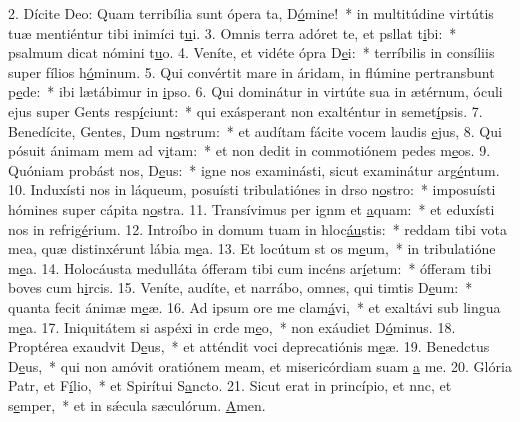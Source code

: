 2. Dícite Deo: Quam terribília sunt ópera ta, D\uline{ó}mine!~* in multitúdine virtútis tuæ mentiéntur tibi inimíci t\uline{u}i.
3. Omnis terra adóret te, et psllat t\uline{i}bi:~* psalmum dicat nómini t\uline{u}o.
4. Veníte, et vidéte ópra D\uline{e}i:~* terríbilis in consíliis super fílios h\uline{ó}minum.
5. Qui convértit mare in áridam, in flúmine pertransbunt p\uline{e}de:~* ibi lætábimur in \uline{i}pso.
6. Qui dominátur in virtúte sua in ætérnum, óculi ejus super Gents resp\uline{í}ciunt:~* qui exásperant non exalténtur in semet\uline{í}psis.
7. Benedícite, Gentes, Dum n\uline{o}strum:~* et audítam fácite vocem laudis \uline{e}jus,
8. Qui pósuit ánimam mem ad v\uline{i}tam:~* et non dedit in commotiónem pedes m\uline{e}os.
9. Quóniam probást nos, D\uline{e}us:~* igne nos examinásti, sicut examinátur arg\uline{é}ntum.
10. Induxísti nos in láqueum, posuísti tribulatiónes in drso n\uline{o}stro:~* imposuísti hómines super cápita n\uline{o}stra.
11. Transívimus per ignm et \uline{a}quam:~* et eduxísti nos in refrig\uline{é}rium.
12. Introíbo in domum tuam in hloc\uline{áu}stis:~* reddam tibi vota mea, quæ distinxérunt lábia m\uline{e}a.
13. Et locútum st os m\uline{e}um,~* in tribulatióne m\uline{e}a.
14. Holocáusta medulláta ófferam tibi cum incéns ar\uline{í}etum:~* ófferam tibi boves cum h\uline{i}rcis.
15. Veníte, audíte, et narrábo, omnes, qui timtis D\uline{e}um:~* quanta fecit ánimæ m\uline{e}æ.
16. Ad ipsum ore me clam\uline{á}vi,~* et exaltávi sub lingua m\uline{e}a.
17. Iniquitátem si aspéxi in crde m\uline{e}o,~* non exáudiet D\uline{ó}minus.
18. Proptérea exaudvit D\uline{e}us,~* et atténdit voci deprecatiónis m\uline{e}æ.
19. Benedctus D\uline{e}us,~* qui non amóvit oratiónem meam, et misericórdiam suam \uline{a} me.
20. Glória Patr, et F\uline{í}lio,~* et Spirítui S\uline{a}ncto.
21. Sicut erat in princípio, et nnc, et s\uline{e}mper,~* et in sǽcula sæculórum. \uline{A}men.
